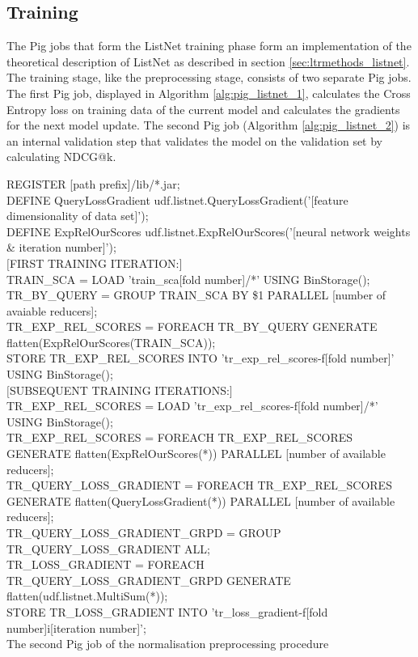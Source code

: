 \subsection{Training}
The Pig jobs that form the ListNet training phase form an implementation of the theoretical description of ListNet as described in section \ref{sec:ltrmethods_listnet}. The training stage, like the preprocessing stage, consists of two separate Pig jobs. The first Pig job, displayed in Algorithm \ref{alg:pig_listnet_1}, calculates the Cross Entropy loss on training data of the current model and calculates the gradients for the next model update. The second Pig job (Algorithm \ref{alg:pig_listnet_2}) is an internal validation step that validates the model on the validation set by calculating \ac{NDCG}@k.\\

\begin{algorithm}
REGISTER [path prefix]/lib/*.jar;\\
DEFINE QueryLossGradient udf.listnet.QueryLossGradient('[feature dimensionality of data set]');\\
DEFINE ExpRelOurScores udf.listnet.ExpRelOurScores('[neural network weights \& iteration number]');\\
$[$FIRST TRAINING ITERATION:$]$\\
\Indp
	TRAIN\_SCA = LOAD 'train\_sca[fold number]/*' USING BinStorage();\\
	TR\_BY\_QUERY = GROUP TRAIN\_SCA BY \$1 PARALLEL [number of avaiable reducers];\\
	TR\_EXP\_REL\_SCORES = FOREACH TR\_BY\_QUERY GENERATE flatten(ExpRelOurScores(TRAIN\_SCA));\\
	STORE TR\_EXP\_REL\_SCORES INTO 'tr\_exp\_rel\_scores-f[fold number]' USING BinStorage();\\
\Indm 
$[$SUBSEQUENT TRAINING ITERATIONS:$]$\\
\Indp
TR\_EXP\_REL\_SCORES = LOAD 'tr\_exp\_rel\_scores-f[fold number]/*' USING BinStorage();\\
TR\_EXP\_REL\_SCORES = FOREACH TR\_EXP\_REL\_SCORES GENERATE flatten(ExpRelOurScores(*)) PARALLEL [number of available reducers];\\
\Indm
TR\_QUERY\_LOSS\_GRADIENT = FOREACH TR\_EXP\_REL\_SCORES GENERATE flatten(QueryLossGradient(*)) PARALLEL [number of available reducers];\\
TR\_QUERY\_LOSS\_GRADIENT\_GRPD = GROUP TR\_QUERY\_LOSS\_GRADIENT ALL;\\
TR\_LOSS\_GRADIENT = FOREACH TR\_QUERY\_LOSS\_GRADIENT\_GRPD GENERATE flatten(udf.listnet.MultiSum(*));\\
STORE TR\_LOSS\_GRADIENT INTO 'tr\_loss\_gradient-f[fold number]i[iteration number]';\\
\caption{The second Pig job of the normalisation preprocessing procedure}
\label{alg:pig_listnet_1}
\end{algorithm}

